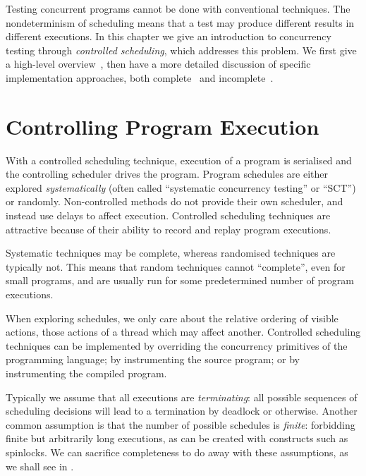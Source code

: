 Testing concurrent programs cannot be done with conventional techniques.  The
nondeterminism of scheduling means that a test may produce different results in
different executions.  In this chapter we give an introduction to concurrency
testing through \emph{controlled scheduling}, which addresses this problem.  We
first give a high-level overview~, then have a more
detailed discussion of specific implementation approaches, both
complete~ and incomplete~.

\section{Controlling Program Execution}
\label{sec:sct-fundamentals}

With a controlled scheduling technique, execution of a program is serialised and
the controlling scheduler drives the program.  Program schedules are either
explored \emph{systematically}\cite{coons2013,musuvathi2008,musuvathi2007,flanagan2005}
(often called ``systematic concurrency testing'' or ``SCT'') or
randomly\cite{thomson2016,burckhardt2010}.  Non-controlled methods do not
provide their own scheduler, and instead use delays to affect
execution\cite{yu2012}.  Controlled scheduling techniques are attractive because
of their ability to record and replay program executions.

Systematic techniques may be complete, whereas randomised techniques are
typically not.  This means that random techniques cannot ``complete'', even for
small programs, and are usually run for some predetermined number of program
executions.

When exploring schedules, we only care about the relative ordering of visible
actions, those actions of a thread which may affect another.  Controlled
scheduling techniques can be implemented by overriding the concurrency
primitives of the programming language\cite{walker2015}; by instrumenting the
source program\cite{claessen2009}; or by instrumenting the compiled
program\cite{yu2012,musuvathi2006}.

Typically we assume that all executions are \emph{terminating}: all possible
sequences of scheduling decisions will lead to a termination by deadlock or
otherwise.  Another common assumption is that the number of possible schedules
is \emph{finite}: forbidding finite but arbitrarily long executions, as can be
created with constructs such as spinlocks.  We can sacrifice completeness to do
away with these assumptions, as we shall see in .

